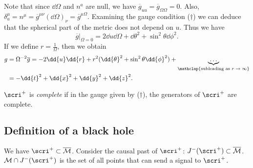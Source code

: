 \documentclass{jknotes}
\begin{document}
\begin{figure}[H]
    \centering
\end{figure}

Note that since \(\dd{\Omega}\) and \(n^a\) are null, we have \(\overline{g}_{uu} = \overline{g}_{\Omega\Omega} = 0\). Also, \(\delta^\mu_u=n^\mu = \overline{g}^{\mu\nu}(\dd{\Omega})_\nu = \overline{g}^{\mu\Omega}\). Examining the gauge condition (\(\dagger\)) we can deduce that the spherical part of the metric does not depend on \(u\). Thus we have
\begin{equation}
    \left.\overline{g}\right|_{\Omega=0} = 2\dd{u}\dd{\Omega} + \dd{\theta}^2 + \sin^2\theta\dd{\phi}^2.
\end{equation}
If we define \(r=\frac{1}{\Omega}\), then we obtain
\begin{align}
    g &= \Omega^{-2}\overline{g} = -2\dd{u}\dd{r}+r^2(\dd{\theta}^2 + \sin^2\theta\dd{\phi}^2) + \underbrace{\dots}_{\mathclap{\text{subleading as \(r \to \infty\)}}} \\
      &= -\dd{t}^2 + \dd{x}^2 + \dd{y}^2 + \dd{z}^2.
\end{align}

\begin{defn}
    \(\scri^+\) is \emph{complete} if in the gauge given by (\(\dagger\)), the generators of \(\scri^+\) are complete.
\end{defn}

\subsection{Definition of a black hole}

We have \(\scri^+ \subset \overline{\mathcal{M}}\). Consider the causal past of \(\scri^+\): \(J^-(\scri^+) \subset \overline{\mathcal{M}}\). \(\mathcal{M}\cap J^-(\scri^+)\) is the set of all points that can send a signal to \(\scri^+\).
\end{document}
